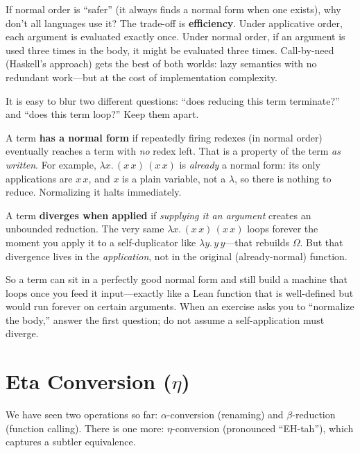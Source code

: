 \documentclass[11pt,a4paper]{article}
\newcounter{exercise}[section]
\theoremstyle{definition}
\newcommand{\lam}{\lambda}
\begin{document}
\begin{intuition}
If normal order is ``safer'' (it always finds a normal form when one exists),
why don't all languages use it? The trade-off is \textbf{efficiency}. Under
applicative order, each argument is evaluated exactly once. Under normal order,
if an argument is used three times in the body, it might be evaluated three
times. Call-by-need (Haskell's approach) gets the best of both worlds: lazy
semantics with no redundant work---but at the cost of implementation complexity.
\end{intuition}

\begin{intuition}
It is easy to blur two different questions: ``does reducing this term
terminate?'' and ``does this term loop?'' Keep them apart.

A term \textbf{has a normal form} if repeatedly firing redexes (in normal
order) eventually reaches a term with \emph{no} redex left. That is a property
of the term \emph{as written}. For example, $\lam x.\, (x\,x)\,(x\,x)$ is
\emph{already} a normal form: its only applications are $x\,x$, and $x$ is a
plain variable, not a $\lam$, so there is nothing to reduce. Normalizing it
halts immediately.

A term \textbf{diverges when applied} if \emph{supplying it an argument}
creates an unbounded reduction. The very same $\lam x.\, (x\,x)\,(x\,x)$
loops forever the moment you apply it to a self-duplicator like
$\lam y.\, y\,y$---that rebuilds $\Omega$. But that divergence lives in the
\emph{application}, not in the original (already-normal) function.

So a term can sit in a perfectly good normal form and still build a machine
that loops once you feed it input---exactly like a Lean function that is
well-defined but would run forever on certain arguments. When an exercise asks
you to ``normalize the body,'' answer the first question; do not assume a
self-application must diverge.
\end{intuition}

\section{Eta Conversion ($\eta$)}\label{sec:eta}

We have seen two operations so far: $\alpha$-conversion (renaming) and
$\beta$-reduction (function calling). There is one more:
$\eta$-conversion (pronounced ``EH-tah''), which captures a subtler
equivalence.
\end{document}
